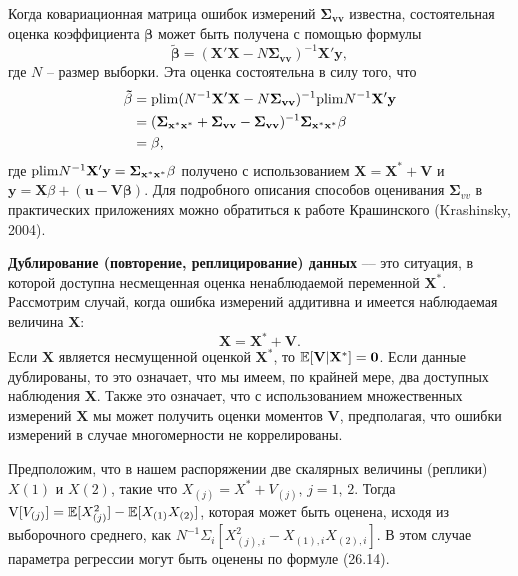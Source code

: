 Когда ковариационная матрица ошибок измерений $\mathbf{\Sigma_{vv}}$ известна, состоятельная оценка коэффициента $\mathbf{\beta}$ может быть получена с помощью формулы
\begin{equation}
\mathbf{\tilde{\beta}}=(\mathbf{X'X}-N \mathbf{\Sigma_{vv}})^{-1} \mathbf{X'y},
\end{equation}
где $N$ – размер выборки. Эта оценка состоятельна в силу того, что
\begin{align*}
\mathbf{\tilde{\beta}}&=\mathrm{plim }(N^{-1}\mathbf{X'X}-N \mathbf{\Sigma_{vv}})^{-1} \mathrm{plim } N^{-1} \mathbf{X'y}  \\
&= (\mathbf{\Sigma_{x^*x^*}} + \mathbf{\Sigma_{vv}} - \mathbf{\Sigma_{vv}})^{-1} \mathbf{\Sigma_{x^*x^*} \beta} \\
&= \mathbf{\beta},
\end{align*}
где $\mathrm{plim } N^{-1} \mathbf{X'y}=\mathbf{\Sigma_{x^*x^*} \beta}$ получено с использованием $\mathbf{X}=\mathbf{X^*}+\mathbf{V}$ и $\mathbf{y}=\mathbf{X} \beta + (\mathbf{u}-\mathbf{V \beta})$. Для подробного описания способов оценивания $\mathbf{\Sigma}_{vv}$ в практических приложениях можно обратиться к работе Крашинского (Krashinsky, 2004).

{\bf Дублирование (повторение, реплицирование) данных} –-- это ситуация, в которой доступна несмещенная оценка ненаблюдаемой переменной $\mathbf{X^*}$. Рассмотрим случай, когда ошибка измерений аддитивна и имеется наблюдаемая величина $\mathbf{X}$:
\[
\mathbf{X}=\mathbf{X^*}+\mathbf{V}.
\]
Если $\mathbf{X}$ является несмущенной оценкой $\mathbf{X^*}$, то $\mathbb{E}[\mathbf{V|X^*}]=\mathbf{0}$. Если данные дублированы, то это означает, что мы имеем, по крайней мере, два доступных наблюдения $\mathbf{X}$. Также это означает, что с использованием множественных измерений $\mathbf{X}$ мы может получить оценки моментов $\mathbf{V}$, предполагая, что ошибки измерений в случае многомерности не коррелированы.

Предположим, что в нашем распоряжении две скалярных величины (реплики) $X(1)$ и $X(2)$, такие что $X_{(j)}=X^*+V_{(j)}, \, j=1, \, 2$. Тогда $\mathrm{V}[V_{(j)}]=\mathbb{E}[X^2_{(j)}]-\mathbb{E}[X_{(1)}X_{(2)}]$, которая может быть оценена, исходя из выборочного среднего, как $N^{-1} \Sigma_i [X^2_{(j),i}-X_{(1),i}X_{(2),i}]$. В этом случае параметра регрессии могут быть оценены  по формуле (26.14). 


